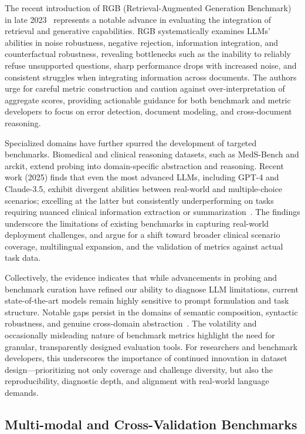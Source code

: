 \documentclass[sigconf]{acmart}
\begin{document}
The recent introduction of RGB (Retrieval-Augmented Generation Benchmark) in late 2023~\cite{ref105} represents a notable advance in evaluating the integration of retrieval and generative capabilities. RGB systematically examines LLMs' abilities in noise robustness, negative rejection, information integration, and counterfactual robustness, revealing bottlenecks such as the inability to reliably refuse unsupported questions, sharp performance drops with increased noise, and consistent struggles when integrating information across documents. The authors urge for careful metric construction and caution against over-interpretation of aggregate scores, providing actionable guidance for both benchmark and metric developers to focus on error detection, document modeling, and cross-document reasoning.

Specialized domains have further spurred the development of targeted benchmarks. Biomedical and clinical reasoning datasets, such as MedS-Bench and arckit, extend probing into domain-specific abstraction and reasoning. Recent work (2025) finds that even the most advanced LLMs, including GPT-4 and Claude-3.5, exhibit divergent abilities between real-world and multiple-choice scenarios; excelling at the latter but consistently underperforming on tasks requiring nuanced clinical information extraction or summarization~\cite{ref95,ref92,ref105}. The findings underscore the limitations of existing benchmarks in capturing real-world deployment challenges, and argue for a shift toward broader clinical scenario coverage, multilingual expansion, and the validation of metrics against actual task data.

Collectively, the evidence indicates that while advancements in probing and benchmark curation have refined our ability to diagnose LLM limitations, current state-of-the-art models remain highly sensitive to prompt formulation and task structure. Notable gaps persist in the domains of semantic composition, syntactic robustness, and genuine cross-domain abstraction~\cite{ref92,ref96,ref97,ref99,ref105}. The volatility and occasionally misleading nature of benchmark metrics highlight the need for granular, transparently designed evaluation tools. For researchers and benchmark developers, this underscores the importance of continued innovation in dataset design---prioritizing not only coverage and challenge diversity, but also the reproducibility, diagnostic depth, and alignment with real-world language demands.

\subsection{Multi-modal and Cross-Validation Benchmarks}
\end{document}
